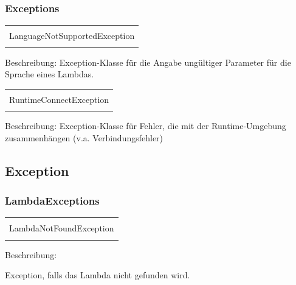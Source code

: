 \documentclass[a4paper,20pt,oneside]{book}
\begin{document}
	
	\subsubsection{Exceptions}
	\centering
	\begin{tabular}{|l|}
	\hline \\
	LanguageNotSupportedException \\ \hline
	\\ \hline
	\end{tabular}
	
	\raggedright
	\vspace{0.5cm}
	Beschreibung:
	\linebreak Exception-Klasse für die Angabe ungültiger Parameter für die Sprache eines Lambdas.
	
	\vspace{0.5cm}
	
	\centering
	\begin{tabular}{|l|}
	\hline \\
	RuntimeConnectException\\ \hline
	\\ \hline
	\end{tabular}	
	
	\raggedright
	\vspace{0.5cm}
	Beschreibung:
	\linebreak Exception-Klasse für Fehler, die mit der Runtime-Umgebung zusammenhängen (v.a. Verbindungsfehler)
	
	\vspace{0.5cm}	
	
	
	\subsection{Exception}
	\subsubsection{LambdaExceptions}
	\centering
	\begin{tabular}{|l|}
	\hline \\
	LambdaNotFoundException\\ \hline
	\\ \hline
	\end{tabular}
	
	\raggedright
	\vspace{0.5cm}	
	
	Beschreibung:
	
	Exception, falls das Lambda nicht gefunden wird.
	
\end{document}
